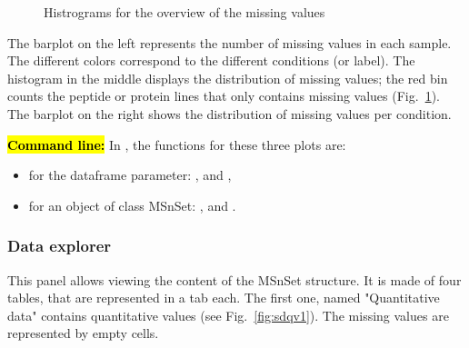 \documentclass[12pt]{article}
\begin{document}
\begin {figure}
\centering
{}
\caption{Histrograms for the overview of the missing values}\label{fig:sdmv}
\end {figure}

The barplot on the left represents the number of missing values in each 
sample. The different colors correspond to the different conditions (or label).
The histogram in the middle displays the distribution of missing values; the 
red bin counts the peptide or protein lines that only contains missing values 
(Fig.~\ref{fig:sdmv}).
{The barplot on the right shows the distribution of missing values per 
condition.}

\hl{\bf Command line:} In , the functions for these three 
plots are:
\begin{itemize}
\item for the dataframe parameter: , 
 and ,
\item for an object of class MSnSet: , 
 and 
.
\end{itemize}


\subsubsection {Data explorer}\label{sec:dataexplorer}
This panel allows viewing the content of the MSnSet structure. It is made of 
four tables, that are represented in a tab each. 
The first one, named "Quantitative data" contains quantitative values 
(see Fig.~\ref{fig:sdqv1}). The missing values are represented by empty cells.
\end{document}
